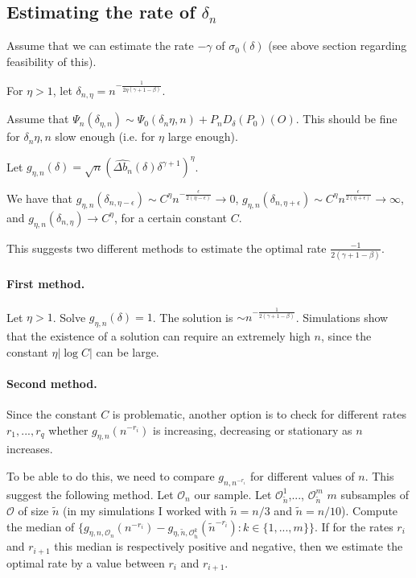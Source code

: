 \documentclass[a4paper]{article}
\begin{document}
\subsection{Estimating the rate of $\delta_n$}

Assume that we can estimate the rate $-\gamma$ of $\sigma_0(\delta)$ (see above section regarding feasibility of this).

For $\eta > 1$, let $\delta_{n, \eta} = n^{-\frac{1}{2 \eta (\gamma + 1 - \beta)}}$.

Assume that $\Psi_n(\delta_{\eta, n}) \sim \Psi_0(\delta_n{\eta, n}) + P_n D_\delta(P_0)(O)$. This should be fine for $\delta_n{\eta, n}$ slow enough (i.e. for $\eta$ large enough).

Let $g_{\eta, n}(\delta) = \sqrt{n} \left( \widehat{\Delta b_n}(\delta) \delta^{\gamma + 1} \right)^\eta$.

We have that $g_{\eta, n}(\delta_{n, \eta - \epsilon}) \sim C^\eta n^{-\frac{\epsilon}{2(\eta - \epsilon)}} \rightarrow 0$, $g_{\eta, n}(\delta_{n, \eta + \epsilon}) \sim C^\eta n^{\frac{\epsilon}{2(\eta + \epsilon)}} \rightarrow \infty$, and $g_{\eta, n}(\delta_{n, \eta}) \rightarrow C^\eta$, for a certain constant $C$.

This suggests two different methods to estimate the optimal rate $\frac{-1}{2(\gamma + 1 - \beta)}$.

\paragraph{First method.} Let $\eta > 1$. Solve $g_{\eta, n}(\delta) = 1$. The solution is $\sim n^{-\frac{1}{2(\gamma + 1 - \beta)}}$. Simulations show that the existence of a solution can require an extremely high $n$, since the constant $\eta |\log C|$ can be large.

\paragraph{Second method.} Since the constant $C$ is problematic, another option is to check for different rates $r_1, ..., r_q$ whether $g_{\eta, n}(n^{-r_i})$ is increasing, decreasing or stationary as $n$ increases.

To be able to do this, we need to compare $g_{n, n^{-r_i}}$ for different values of $n$. This suggest the following method. Let $\mathcal{O}_n$ our sample. Let $\mathcal{O}_{\tilde{n}}^1$,..., $\mathcal{O}_{\tilde{n}}^m$ $m$ subsamples of $\mathcal{O}$ of size $\tilde{n}$ (in my simulations I worked with $\tilde{n} = n / 3$ and $\tilde{n} = n / 10$). Compute the median of $\{g_{\eta, n, \mathcal{O}_n}(n^{-r_i}) - g_{\eta, \tilde{n}, \mathcal{O}_{\tilde{n}}^k}(\tilde{n}^{-r_i}) : k \in \{1,...,m\} \}$. If for the rates $r_i$ and $r_{i + 1}$ this median is respectively positive and negative, then we estimate the optimal rate by a value between $r_i$ and $r_{i+1}$.
\end{document}
